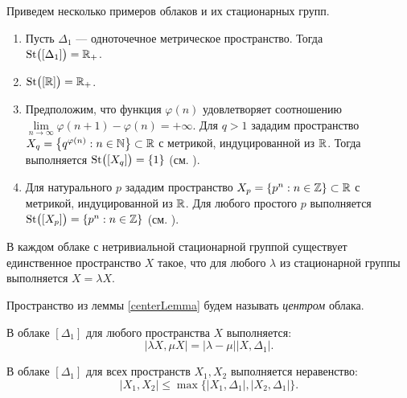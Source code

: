 \begin{example}
  Приведем несколько примеров облаков и их стационарных групп.
  \begin{enumerate}
    \item Пусть $\Delta_1$ --- одноточечное метрическое
      пространство.  Тогда\\ $\operatorname{St}\bigl([\Delta_1]\bigr) = \mathbb{R}_+$.
    \item $\operatorname{St}\bigl([\mathbb{R}]\bigr) = \mathbb{R}_+ $.
    \item Предположим, что функция $\varphi(n)$ удовлетворяет соотношению
      $\lim\limits_{n \rightarrow \infty } \varphi(n + 1) - \varphi(n) =
      +\infty$. Для $q > 1$ зададим пространство $X_q =
      \left\{q^{\varphi(n)}: n \in \mathbb{N}\right\} \subset \mathbb R$ с метрикой,
      индуцированной из \( \mathbb R \).
      Тогда выполняется
      $\operatorname{St}\bigl(\left[X_q\right]\bigr) = \{1\}$ (см. \cite{TuzhBog1}).
    \item Для натурального $p$ зададим пространство $X_p = \left\{p^n:n
      \in \mathbb{Z}\right\} \subset \mathbb R$ с метрикой, индуцированной из \( \mathbb R \).
      Для любого простого $p$ выполняется $\operatorname{St}\bigl(\left[X_p\right]\bigr) =
      \left\{p^n:n \in \mathbb{Z}\right\}$ (см. \cite{BogBog1}).
  \end{enumerate}
\end{example}
\begin{lemma}
  В каждом облаке с нетривиальной стационарной группой существует единственное
  пространство $X$ такое, что для любого $\lambda$ из стационарной группы
  выполняется $X = \lambda X$.
  \label{centerLemma}
\end{lemma}
\begin{definition}
  Пространство из леммы \ref{centerLemma} будем называть \emph{центром} облака.
\end{definition}
\begin{remark} В
  облаке $[\Delta_1]$ для любого пространства $X$ выполняется:
  $$|\lambda X, \mu X| = |\lambda - \mu||X,\Delta_1|.$$
\end{remark}
\begin{remark} В облаке
  $[\Delta_{1}]$ для всех пространств $X_{1}, X_{2}$ выполняется неравенство:
  \[
    |X_{1},X_{2}| \le \max\big\{|X_{1}, \Delta_{1}|,|X_{2},\Delta_{1}|\big\}.
  \]
  \label{remUltraMetric}
\end{remark}
